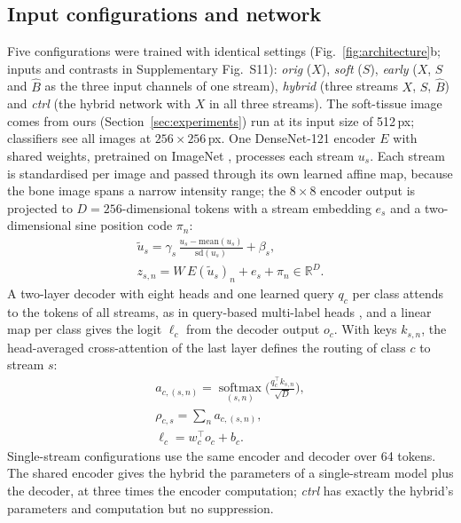 \subsection{Input configurations and network}
Five configurations were trained with identical settings (Fig.~\ref{fig:architecture}b; inputs and contrasts in Supplementary Fig.~S11): \emph{orig} ($X$), \emph{soft} ($S$), \emph{early} ($X$,
$S$ and $\hat B$ as the three input channels of one stream), \emph{hybrid} (three streams $X$, $S$, $\hat B$) and \emph{ctrl} (the hybrid
network with $X$ in all three streams). The soft-tissue image comes from ours (Section~\ref{sec:experiments}) run at its input size of 512\,px;
classifiers see all images at $256\times256$\,px. One DenseNet-121 encoder $E$ \citep{huang2017densenet} with shared weights, pretrained on
ImageNet \citep{deng2009imagenet,wightman2019timm}, processes each stream $u_s$. Each stream is standardised per image and passed through its own
learned affine map, because the bone image spans a narrow intensity range; the $8\times8$ encoder output is projected to $D=256$-dimensional
tokens with a stream embedding $e_s$ and a two-dimensional sine position code $\pi_n$:
\begin{equation}
\begin{gathered}
\tilde u_s=\gamma_s\,\frac{u_s-\mathrm{mean}(u_s)}{\mathrm{sd}(u_s)}+\beta_s,\\
z_{s,n}=W\,E(\tilde u_s)_n+e_s+\pi_n\in\mathbb{R}^{D}.
\end{gathered}
\label{eq:tokens}
\end{equation}
A two-layer decoder with eight heads and one learned query $q_c$ per class attends to the tokens of all streams, as in query-based
multi-label heads \citep{liu2021query2label,ridnik2023mldecoder}, and a linear map per class gives the logit $\ell_c$ from the decoder output
$o_c$. With keys $k_{s,n}$, the head-averaged cross-attention of the last layer defines the routing of class $c$ to stream $s$:
\begin{equation}
\begin{gathered}
a_{c,(s,n)}=\operatorname*{softmax}_{(s,n)}\Big(\frac{q_c^{\top}k_{s,n}}{\sqrt{D}}\Big),\\
\rho_{c,s}=\sum_{n}a_{c,(s,n)},\\
\ell_c=w_c^{\top}o_c+b_c.
\end{gathered}
\label{eq:routing}
\end{equation}
Single-stream configurations use the same encoder and decoder over 64 tokens. The shared encoder gives the hybrid the parameters of a
single-stream model plus the decoder, at three times the encoder computation; \emph{ctrl} has exactly the hybrid's parameters and
computation but no suppression.


